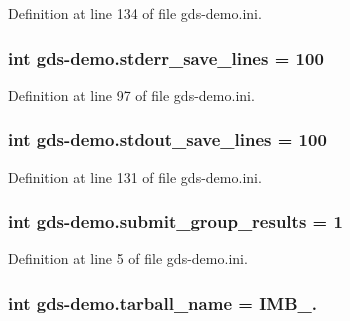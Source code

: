 Definition at line 134 of file gds-\/demo.\-ini.

\hypertarget{namespacegds-demo_ae2556946a1f4a30ed436e2abf70e10cc}{
\subsubsection[{stderr\-\_\-save\-\_\-lines}]{\setlength{\rightskip}{0pt plus 5cm}int gds-\/demo.\-stderr\-\_\-save\-\_\-lines = 100}}\label{namespacegds-demo_ae2556946a1f4a30ed436e2abf70e10cc}


Definition at line 97 of file gds-\/demo.\-ini.

\hypertarget{namespacegds-demo_a4ddff33e8b6b2a311784d75fa21f6f1c}{
\subsubsection[{stdout\-\_\-save\-\_\-lines}]{\setlength{\rightskip}{0pt plus 5cm}int gds-\/demo.\-stdout\-\_\-save\-\_\-lines = 100}}\label{namespacegds-demo_a4ddff33e8b6b2a311784d75fa21f6f1c}


Definition at line 131 of file gds-\/demo.\-ini.

\hypertarget{namespacegds-demo_a62244f93362dda6490422a8beb98d7c6}{
\subsubsection[{submit\-\_\-group\-\_\-results}]{\setlength{\rightskip}{0pt plus 5cm}int gds-\/demo.\-submit\-\_\-group\-\_\-results = 1}}\label{namespacegds-demo_a62244f93362dda6490422a8beb98d7c6}


Definition at line 5 of file gds-\/demo.\-ini.

\hypertarget{namespacegds-demo_a8fcb550711ba106cd90629961428d4d2}{
\subsubsection[{tarball\-\_\-name}]{\setlength{\rightskip}{0pt plus 5cm}int gds-\/demo.\-tarball\-\_\-name = I\-M\-B\-\_.}}\label{namespacegds-demo_a8fcb550711ba106cd90629961428d4d2}


